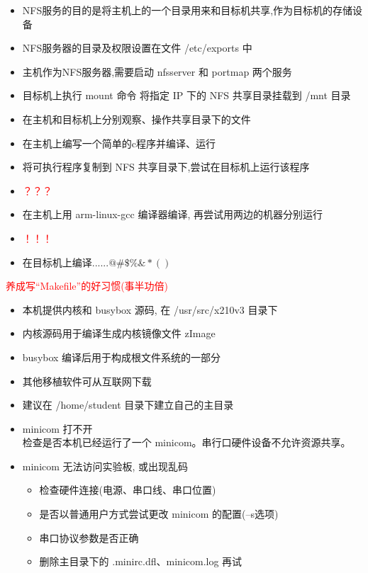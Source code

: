 \begin{itemize}
  \item NFS服务的目的是将主机上的一个目录用来和目标机共享,作为目标机的存储设备
  \item NFS服务器的目录及权限设置在文件 /etc/exports 中
  \item 主机作为NFS服务器,需要启动 nfsserver 和 portmap 两个服务
  \item 目标机上执行 mount 命令 将指定 IP 下的 NFS 共享目录挂载到 /mnt 目录
  \item 在主机和目标机上分别观察、操作共享目录下的文件
\end{itemize}
\endslide

\begin{itemize}
  \item 在主机上编写一个简单的c程序并编译、运行
  \item 将可执行程序复制到 NFS 共享目录下,尝试在目标机上运行该程序
  \item \textcolor{red}{？？？}
  \item 在主机上用 arm-linux-gcc 编译器编译, 再尝试用两边的机器分别运行
  \item \textcolor{red}{！！！}
  \item 在目标机上编译......$\! @\#\$\%\&*()$
\end{itemize}
\textcolor{red}{养成写``Makefile''的好习惯(事半功倍)}
\endslide

\begin{itemize}
  \item 本机提供内核和 busybox 源码, 在 /usr/src/x210v3 目录下
  \item 内核源码用于编译生成内核镜像文件 zImage
  \item busybox 编译后用于构成根文件系统的一部分
  \item 其他移植软件可从互联网下载
  \item 建议在 /home/student 目录下建立自己的主目录
\end{itemize}
\endslide

\begin{itemize}
  \item minicom 打不开\\
		检查是否本机已经运行了一个 minicom。串行口硬件设备不允许资源共享。
  \item minicom 无法访问实验板, 或出现乱码
  \begin{itemize}
	\item 检查硬件连接(电源、串口线、串口位置)
	\item 是否以普通用户方式尝试更改 minicom 的配置(--s选项)
	\item 串口协议参数是否正确
	\item 删除主目录下的 .minirc.dfl、minicom.log 再试
  \end{itemize}
\end{itemize}
\endslide

